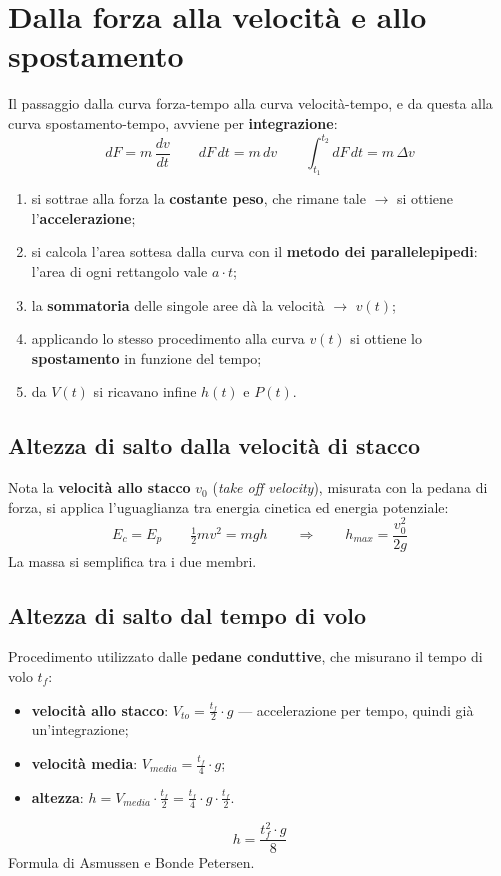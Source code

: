 \section{Dalla forza alla velocità e allo spostamento}

Il passaggio dalla curva forza-tempo alla curva velocità-tempo, e da questa alla curva
  spostamento-tempo, avviene per \textbf{integrazione}:
\[ dF = m\,\frac{dv}{dt} \qquad dF\,dt = m\,dv \qquad \int_{t_1}^{t_2} dF\,dt = m\,\Delta v \]

\begin{enumerate}
  \item si sottrae alla forza la \textbf{costante peso}, che rimane tale $\rightarrow$ si ottiene
    l'\textbf{accelerazione};
  \item si calcola l'area sottesa dalla curva con il \textbf{metodo dei parallelepipedi}: l'area di
    ogni rettangolo vale $a \cdot t$;
  \item la \textbf{sommatoria} delle singole aree dà la velocità $\rightarrow$ $v(t)$;
  \item applicando lo stesso procedimento alla curva $v(t)$ si ottiene lo \textbf{spostamento} in
    funzione del tempo;
  \item da $V(t)$ si ricavano infine $h(t)$ e $P(t)$.
\end{enumerate}

\subsection{Altezza di salto dalla velocità di stacco}

Nota la \textbf{velocità allo stacco} $v_0$ (\textit{take off velocity}), misurata con la pedana di
forza, si applica l'uguaglianza tra energia cinetica ed energia potenziale:
\[ E_c = E_p \qquad \tfrac{1}{2}mv^2 = mgh \qquad \Rightarrow \qquad h_{max} = \frac{v_0^2}{2g} \]
La massa si semplifica tra i due membri.

\subsection{Altezza di salto dal tempo di volo}

Procedimento utilizzato dalle \textbf{pedane conduttive}, che misurano il tempo di volo $t_f$:
\begin{itemize}
  \item \textbf{velocità allo stacco}: $V_{to} = \frac{t_f}{2} \cdot g$ --- accelerazione per tempo,
    quindi già un'integrazione;
  \item \textbf{velocità media}: $V_{media} = \frac{t_f}{4} \cdot g$;
  \item \textbf{altezza}: $h = V_{media} \cdot \frac{t_f}{2} = \frac{t_f}{4} \cdot g \cdot
    \frac{t_f}{2}$.
\end{itemize}
\[ h = \frac{t_f^2 \cdot g}{8} \]
Formula di Asmussen e Bonde Petersen.

